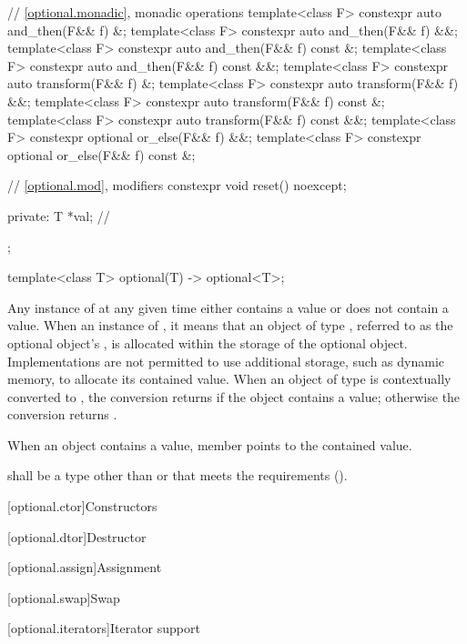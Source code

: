 \begin{codeblock}
{{    // \ref{optional.monadic}, monadic operations
    template<class F> constexpr auto and_then(F&& f) &;
    template<class F> constexpr auto and_then(F&& f) &&;
    template<class F> constexpr auto and_then(F&& f) const &;
    template<class F> constexpr auto and_then(F&& f) const &&;
    template<class F> constexpr auto transform(F&& f) &;
    template<class F> constexpr auto transform(F&& f) &&;
    template<class F> constexpr auto transform(F&& f) const &;
    template<class F> constexpr auto transform(F&& f) const &&;
    template<class F> constexpr optional or_else(F&& f) &&;
    template<class F> constexpr optional or_else(F&& f) const &;

    // \ref{optional.mod}, modifiers
    constexpr void reset() noexcept;

  private:
    T *val;         // \expos
  };

  template<class T>
    optional(T) -> optional<T>;
}
\end{codeblock}

\pnum
Any instance of  at any given time either contains a value or does not contain a value.
When an instance of  ,
it means that an object of type , referred to as the optional object's ,
is allocated within the storage of the optional object.
Implementations are not permitted to use additional storage, such as dynamic memory, to allocate its contained value.
When an object of type  is contextually converted to ,
the conversion returns  if the object contains a value;
otherwise the conversion returns .

\pnum
When an  object contains a value,
member  points to the contained value.

\pnum
{} shall be a  type
other than \cv{}  or \cv{} 
that meets the  requirements ().

[optional.ctor]{Constructors}


[optional.dtor]{Destructor}

[optional.assign]{Assignment}


[optional.swap]{Swap}


[optional.iterators]{Iterator support}

